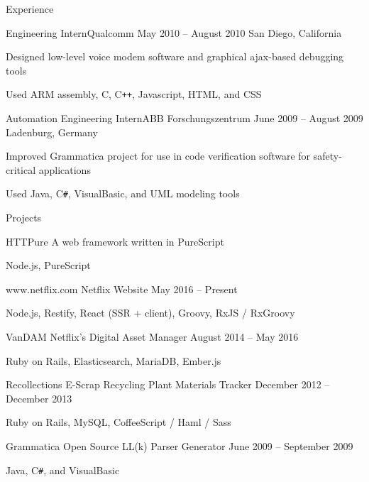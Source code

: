 \documentclass{resume}
\begin{document}
\begin{section}{Experience}
		\begin{experience}{Engineering Intern}{Qualcomm}
		                  {May 2010 – August 2010}
		                  {San Diego, California}
			\item Designed low-level voice modem software and
                          graphical ajax-based debugging tools
			\item Used ARM assembly, C, C\texttt{++}, Javascript,
                          HTML, and CSS
		\end{experience}

		\begin{experience}{Automation Engineering Intern}{ABB Forschungszentrum}
		                  {June 2009 – August 2009}
		                  {Ladenburg, Germany}
			\item Improved Grammatica project for use in code
                          verification software for safety-critical applications
			\item Used Java, C\texttt{\#}, VisualBasic, and UML
                          modeling tools
		\end{experience}

	\end{section}

	\begin{section}{Projects}
		\begin{project}{HTTPure}
		               {A web framework written in PureScript}
			       {}
			\item Node.js, PureScript
		\end{project}

		\begin{project}{www.netflix.com}
		               {Netflix Website}
			       {May 2016 – Present}
			\item Node.js, Restify, React (SSR + client), Groovy,
                          RxJS / RxGroovy
		\end{project}

		\begin{project}{VanDAM}
		               {Netflix's Digital Asset Manager}
			       {August 2014 – May 2016}
			\item Ruby on Rails, Elasticsearch, MariaDB, Ember.js
		\end{project}

		\begin{project}{Recollections}
		               {E-Scrap Recycling Plant Materials Tracker}
		               {December 2012 – December 2013}
                        \item Ruby on Rails, MySQL, CoffeeScript / Haml / Sass
		\end{project}

		\begin{project}{Grammatica}
		               {Open Source LL(k) Parser Generator} %
		               {June 2009 – September 2009}
                        \item Java, C\texttt{\#}, and VisualBasic
		\end{project}
	\end{section}
\end{document}
